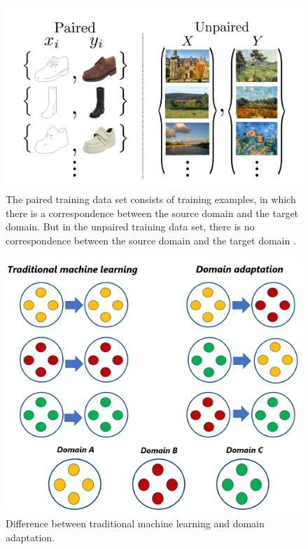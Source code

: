 \begin{figure}[H]
        \begin{center}
	    \includegraphics[scale=0.50]{images/Introduction/img_translation.JPG}
	    \caption[The paired training data set consists of training examples, in which there is a correspondence between the source domain and the target domain. But in the unpaired training data set, there is no correspondence between the source domain and the target domain.]{The paired training data set consists of training examples, in which there is a correspondence between the source domain and the target domain. But in the unpaired training data set, there is no correspondence between the source domain and the target domain \cite{zhu2020unpaired}.}
	    \label{fig:img_translation}
	    \end{center}
\end{figure}


\begin{figure}[H]
        \begin{center}
	 	    \includegraphics[scale=0.28]{images/Introduction/DomainAdaptation.png}
	    \caption[Difference between traditional machine learning and domain adaptation.]{Difference between traditional machine learning and domain adaptation.}
	    \label{fig:DomainAdaptation}
	    \end{center}
\end{figure}




